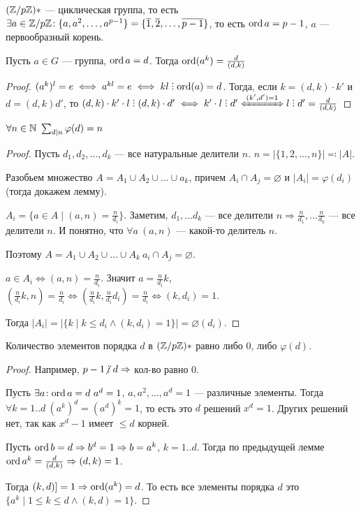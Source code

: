 \begin{theorem}
    $(\mathbb{Z} / p \mathbb{Z})*$ --- циклическая группа, то  есть  $\exists a \in \mathbb{Z} / p \mathbb{Z}\!: \{a, a^2,\ldots,a^{p-1}\} = \{\overline{1}, \overline{2},\ldots, \overline{p-1}\}$, то есть $\operatorname{ord} a = p - 1$,  $a$ --- первообразный корень.
\end{theorem}
\begin{lemma}
    Пусть $a \in G$ --- группа,  $\operatorname{ord} a = d$. Тогда  $\operatorname{ord}(a^k) = \frac{d}{(d, k)}$
\end{lemma}
\begin{proof}
    $(a^k)^l = e \iff a^{kl} = e \iff kl \divby \ord(a) = d$. Тогда, если $k = (d, k) \cdot k'$  и  $d = (d, k) d'$, то  $(d, k) \cdot k' \cdot l \divby (d, k) \cdot d' \iff k' \cdot l \divby d' \xLeftrightarrow{(k', d') = 1} l \divby d' = \frac{d}{(d, k)}$ 
\end{proof}
\begin{lemma}
    $\forall n \in \mathbb{N}\ \sum_{d \mid n} \varphi(d) = n$
\end{lemma}
\begin{proof}
    Пусть $d_1, d_2, \ldots, d_k$ --- все натуральные делители $n$.  $n = |\{1, 2, \ldots, n\}| \eqqcolon |A|$.

    Разобьем множество $A = A_1 \cup A_2 \cup \ldots \cup a_k$, причем $A_i \cap A_j = \varnothing$ и  $|A_i| = \varphi(d_i)$ (тогда докажем лемму).

    $A_i = \{ a \in A \mid (a, n) = \frac{n}{d_i}\}$. Заметим, $d_1, \ldots d_k$ --- все делители $n \Rightarrow \frac{n}{d_1}, \ldots \frac{n}{d_k}$ --- все делители $n$. И понятно, что  $\forall a\ (a, n)$ --- какой-то делитель  $n$. 

     Поэтому $A = A_1 \cup A_2 \cup \ldots \cup A_k\ a_i \cap A_j = \varnothing$.

     $a \in A_i \iff (a, n) = \frac{n}{d_i}$. Значит $a = \frac{n}{d_i}k$, $(\frac{n}{d_i}k, n) = \frac{n}{d_i} \iff (\frac{n}{d_i}k, \frac{n}{d_i}d_i) = \frac{n}{d_i} \iff (k, d_i) = 1$. 

     Тогда $|A_i| = |\{ k \mid k \le d_i \land (k, d_i) = 1\}| = \varnothing(d_i)$.
\end{proof}
\begin{lemma}
    Количество элементов порядка $d$ в  $(\mathbb{Z} / p \mathbb{Z})*$ равно либо 0, либо  $\varphi(d)$. 
\end{lemma}
\begin{proof}
    Например, $p-1 \centernot \divby d \Rightarrow $ кол-во равно  $0$. 

    Пусть  $\exists a\!: \operatorname{ord} a = d\ a^d = 1$, $a, a^2, \ldots, a^d = 1$ --- различные элементы. Тогда $\forall k=1..d\ (a^k)^d = (a^d)^k = 1$, то есть это  $d$ решений  $x^d = 1$. Других решений нет, так как  $x^d - 1$ имеет  $\le d$ корней.

    Пусть $\operatorname{ord} b = d \Rightarrow b^d = 1 \Rightarrow b = a^k$,  $k = 1..d$. Тогда по предыдущей лемме  $\operatorname{ord} a^k = \frac{d}{(d, k)} \Rightarrow (d, k) = 1$. 

    Тогда $(k, d) ]= 1 \Rightarrow \operatorname{ord}(a^k) = d$. То есть все элементы порядка  $d$ это  $\{a^k \mid 1 \le k \le d \land (k, d) = 1 \}$.
\end{proof}
